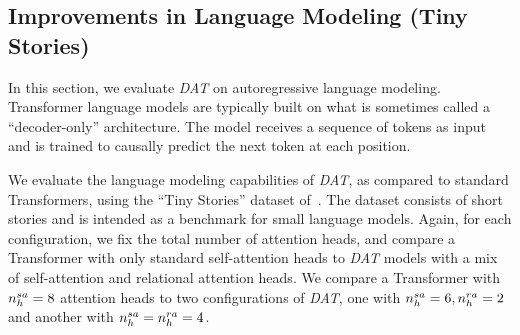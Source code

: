 \subsection{Improvements in Language Modeling (Tiny Stories)}\label{ssec:tiny_stories}

In this section, we evaluate \textit{DAT} on autoregressive language modeling. Transformer language models are typically built on what is sometimes called a ``decoder-only'' architecture. The model receives a sequence of tokens as input and is trained to causally predict the next token at each position.

We evaluate the language modeling capabilities of \textit{DAT}, as compared to standard Transformers, using the ``Tiny Stories'' dataset of~\citet{eldanTinyStoriesHowSmall2023}. The dataset consists of short stories and is intended as a benchmark for small language models. Again, for each configuration, we fix the total number of attention heads, and compare a Transformer with only standard self-attention heads to \textit{DAT} models with a mix of self-attention and relational attention heads. We compare a Transformer with $n_h^{sa} = 8$ attention heads to two configurations of \textit{DAT}, one with $n_h^{sa} = 6, n_h^{ra} = 2$ and another with $n_h^{sa} = n_h^{ra} = 4$.

